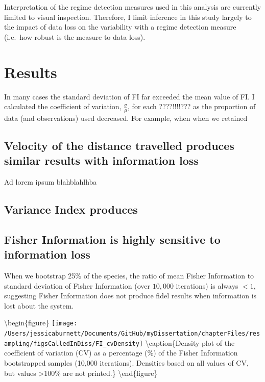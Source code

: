 \documentclass[12pt,twoside,openany]{reedthesis}
\begin{document}
Interpretation of the regime detection measures used in this analysis are currently limited to visual inspection. Therefore, I limit inference in this study largely to the impact of data loss on the variability with a regime detection measure (i.e.~how robust is the measure to data loss).

\hypertarget{results-2}{%
\section{Results}\label{results-2}}

In many cases the standard deviation of FI far exceeded the mean value of FI. I calculated the coefficient of variation, \(\frac{\sigma}{\mu}\), for each ????!!!!??? as the proportion of data (and observations) used decreased. For example, when when we retained

\hypertarget{velocity-of-the-distance-travelled-produces-similar-results-with-information-loss}{%
\subsection{Velocity of the distance travelled produces similar results with information loss}\label{velocity-of-the-distance-travelled-produces-similar-results-with-information-loss}}

Ad lorem ipsum blahblahlhba

\hypertarget{variance-index-produces}{%
\subsection{Variance Index produces}\label{variance-index-produces}}

\hypertarget{fisher-information-is-highly-sensitive-to-information-loss}{%
\subsection{Fisher Information is highly sensitive to information loss}\label{fisher-information-is-highly-sensitive-to-information-loss}}

When we bootstrap 25\% of the species, the ratio of mean Fisher Information to standard deviation of Fisher Information (over \(10,000\) iterations) is always \(< 1\), suggesting Fisher Information does not produce fidel results when information is lost about the system.

\textbackslash begin\{figure\}
\texttt{[image: /Users/jessicaburnett/Documents/GitHub/myDissertation/chapterFiles/resampling/figsCalledInDiss/FI\_cvDensity]} \textbackslash caption\{Density plot of the coefficient of variation (CV) as a percentage (\%) of the Fisher Information bootstrapped samples (10,000 iterations). Densities based on all values of CV, but values \textgreater100\% are not printed.\}\label{fig:results}
\textbackslash end\{figure\}
\end{document}
